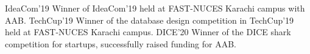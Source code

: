 
\begin{cvskills}
    \cvskill
    {IdeaCom'19} %
    {Winner of IdeaCom'19 held at FAST-NUCES Karachi campus with AAB.}
    \cvskill
    {TechCup'19} %
    {Winner of the database design competition in TechCup'19 held at FAST-NUCES Karachi campus.}
    \cvskill
    {DICE'20} %
    {Winner of the DICE shark competition for startups, successfully raised funding for AAB.}

\end{cvskills}